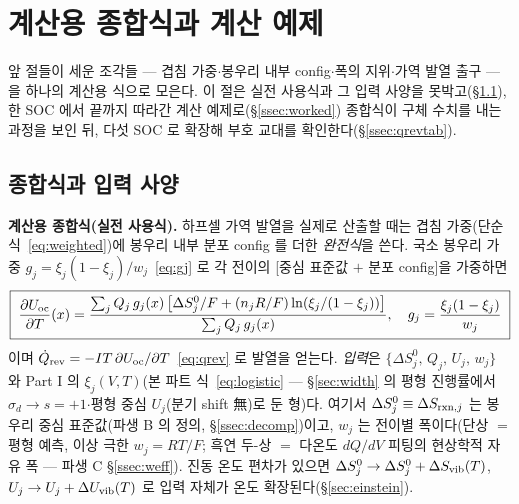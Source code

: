 \section{계산용 종합식과 계산 예제}\label{sec:synthesis}

앞 절들이 세운 조각들 --- 겹침 가중$\cdot$봉우리 내부 config$\cdot$폭의 지위$\cdot$가역 발열 출구 --- 을 하나의
계산용 식으로 모은다. 이 절은 실전 사용식과 그 입력 사양을 못박고(\S\ref{ssec:synth}), 한 SOC 에서 끝까지
따라간 계산 예제로(\S\ref{ssec:worked}) 종합식이 구체 수치를 내는 과정을 보인 뒤, 다섯 SOC 로 확장해 부호
교대를 확인한다(\S\ref{ssec:qrevtab}).

\subsection{종합식과 입력 사양}\label{ssec:synth}
\begin{keybox}
\textbf{계산용 종합식(실전 사용식).} 하프셀 가역 발열을 실제로 산출할 때는 겹침 가중(단순식~\eqref{eq:weighted})에
봉우리 내부 분포 config 를 더한 \emph{완전식}을 쓴다. 국소 봉우리 가중 $g_j=\xi_j(1-\xi_j)/w_j$~\eqref{eq:gj}
로 각 전이의 [중심 표준값 $+$ 분포 config]을 가중하면
\begin{equation}
\boxed{\;\frac{\partial U_{\mathrm{oc}}}{\partial T}(x)
=\frac{\sum_j Q_j\,g_j(x)\,\bigl[\Delta S^0_j/F+(n_jR/F)\ln(\xi_j/(1-\xi_j))\bigr]}{\sum_j Q_j\,g_j(x)},\quad
g_j=\frac{\xi_j(1-\xi_j)}{w_j}\;}
\label{eq:complete}
\end{equation}
이며 $\dot Q_{\mathrm{rev}}=-IT\,\partial U_{\mathrm{oc}}/\partial T$~\eqref{eq:qrev} 로 발열을 얻는다. \emph{입력}은
$\{\Delta S^0_j,\,Q_j,\,U_j,\,w_j\}$ 와 Part I 의 $\xi_j(V,T)$(본 파트 식~\eqref{eq:logistic} --- \S\ref{sec:width}
의 평형 진행률에서 $\sigma_d\to s{=}+1$$\cdot$평형 중심 $U_j$(분기 shift 無)로 둔 형)다. 여기서
$\Delta S^0_j\equiv\Delta S_{\mathrm{rxn},j}$ 는 봉우리 중심 표준값(파생 B 의 정의, \S\ref{ssec:decomp})이고, $w_j$ 는
전이별 폭이다(단상 $=$ 평형 예측, 이상 극한 $w_j{=}RT/F$; 흑연 두-상 $=$ 다온도 $dQ/dV$ 피팅의 현상학적 자유
폭 --- 파생 C \S\ref{ssec:weff}). 진동 온도 편차가 있으면 $\Delta S^0_j\to\Delta S^0_j+\Delta S_{\mathrm{vib}}(T)$,
$U_j\to U_j+\Delta U_{\mathrm{vib}}(T)$ 로 입력 자체가 온도 확장된다(\S\ref{sec:einstein}).
\end{keybox}


